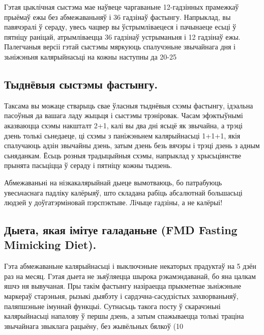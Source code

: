 Гэтая цыклічная сыстэма мае наўвеце чаргаваньне 12-гадзінных прамежкаў прыёмаў ежы без абмежаваньняў і 36 гадзінаў фастынгу. Напрыклад, вы павячэралі ў сераду, увесь чацвер вы ўстрымліваецеся і пачынаеце есьці ў пятніцу раніцай, атрымліваецца 36 гадзінаў устрыманьня і 12 гадзінаў ежы. Палегчаныя версіі гэтай сыстэмы мяркуюць спалучэньне звычайнага дня і зьніжэньня калярыйнасьці на кожны наступны да 20-25%

\subsection{Тыднёвыя сыстэмы фастынгу.}
Таксама вы можаце стварыць свае ўласныя тыднёвыя схэмы фастынгу, ідэальна пасоўныя да вашага ладу жыцьця і сыстэмы трэніровак. Часам эфэктыўнымі аказваюцца схэмы накшталт 2+1, калі вы два дні ясьцё як звычайна, а трэці дзень толькі сьнедаеце, ці схэмы з паніжэньнем калярыйнасьці 1+1+1, якія спалучаюць адзін звычайны дзень, затым дзень безь вячэры і трэці дзень з адным сьняданкам. Ёсьць розныя традыцыйныя схэмы, напрыклад у хрысьціянстве прынята пасьціцца ў сераду і пятніцу кожны тыдзень.

Абмежаваньні на нізкакалярыйнай дыеце вымотваюць, бо патрабуюць увесьчаснага падліку калёрыяў, што складана рабіць абсалютнай большасьці людзей у доўгатэрміновай пэрспэктыве. Лічыце гадзіны, а не калёрыі!

\subsection{Дыета, якая імітуе галаданьне (FMD Fasting Mimicking Diet).}
Гэта абмежаваньне калярыйнасьці і выключэньне некаторых прадуктаў на 5 дзён раз на месяц. Гэтая дыета не зьяўляецца шырока рэкамэндаванай, бо яна цалкам яшчэ ня вывучаная. Пры такім фастынгу назіраецца прыкметнае зьніжэньне маркераў старэньня, рызыкі дыябэту і сардэчна-сасудзістых захворваньняў, паляпшэньне імуннай функцыі. Сутнасьць такога посту ў скарачэньні калярыйнасьці напалову ў першы дзень, а затым спажываецца толькі траціна звычайнага звыклага рацыёну, без жывёльных бялкоў (10%

